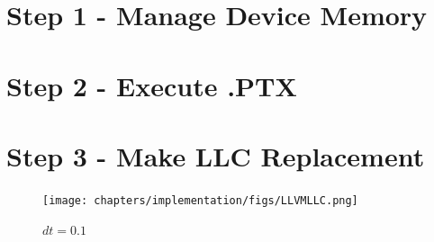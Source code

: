 \section{Step 1 - Manage Device Memory}

\section{Step 2 - Execute .PTX}

\section{Step 3 - Make LLC Replacement}

\begin{figure}[!htb]
    \centering
    \begin{minipage}{.7\textwidth}
        \centering
        \texttt{[image: chapters/implementation/figs/LLVMLLC.png]}
        \caption{$dt=0.1$}
        \label{fig:prob1_6_2}
    \end{minipage}%
    \begin{minipage}{0.4\textwidth}
        \centering

\end{minipage}
\end{figure}
